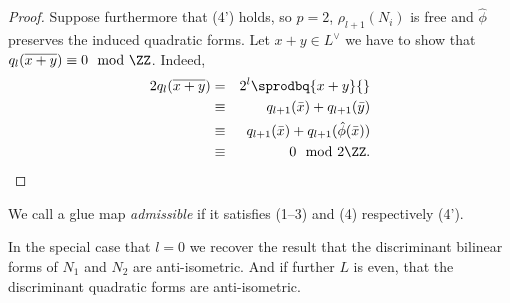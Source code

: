 \begin{proof}
Suppose furthermore that (4') holds, so $p=2$, $\rho_{l+1}(N_i)$ is free and $\hat \phi$ preserves the induced quadratic forms. Let $x+y \in L^\vee$ we have to show that $q_l(\overline{x+y})\equiv 0 \mod \ZZ$.
Indeed,
\begin{eqnarray*}
2q_l(\overline{x+y})
&=& 2^{l} \sprodbq{x+y}{}\\
&\equiv& q_{l+1}(\bar x)+q_{l+1}(\bar y)\\
&\equiv&
q_{l+1}(\bar x)+q_{l+1}(\hat \phi(\bar x)) \\
&\equiv& 0 \mod 2 \ZZ.
\qedhere
\end{eqnarray*}
\end{proof}

\begin{definition}\label{def:admissible-glue-map}
 We call a glue map \emph{admissible} if it satisfies 
(1--3) and (4) respectively (4').
\end{definition}


\begin{example}
 In the special case that $l=0$ we recover the result that the discriminant bilinear forms of $N_1$ and $N_2$ are anti-isometric.
 And if further $L$ is even, that the discriminant quadratic forms are anti-isometric.
\end{example}



